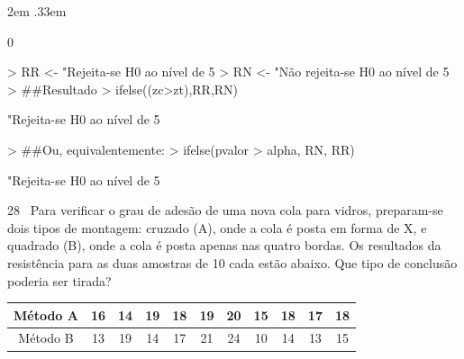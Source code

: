 \documentclass{article}
\newenvironment{ManualExercise}
  {\begin{list}{}{\leftmargin \QuestionIndent
    \partopsep0pt \parsep\parskip \topsep\QuestionBefore
    \itemsep\QuestionBefore \labelwidth2em
    \labelsep.33em
    \usecounter{Question}}}
  {\end{list}}
\begin{document}
\begin{Exercise}
\begin{ManualExercise}
\begin{Schunk}
\begin{Soutput}
[1] 0
\end{Soutput}
\begin{Sinput}
> RR <- "Rejeita-se H0 ao nível de 5%
> RN <- "Não rejeita-se H0 ao nível de 5%
> ##Resultado
> ifelse((zc>zt),RR,RN)
\end{Sinput}
\begin{Soutput}
[1] "Rejeita-se H0 ao nível de 5%
\end{Soutput}
\begin{Sinput}
> ##Ou, equivalentemente:
> ifelse(pvalor > alpha, RN, RR)
\end{Sinput}
\begin{Soutput}
[1] "Rejeita-se H0 ao nível de 5%
\end{Soutput}
\end{Schunk}

\item[28~] Para verificar o grau de adesão de uma nova cola para vidros, preparam-se dois tipos de montagem: cruzado (A), onde a cola é posta em forma de X, e quadrado (B), onde a cola é posta apenas nas quatro bordas. Os resultados da resistência para as duas amostras de 10 cada estão abaixo. Que tipo de conclusão poderia ser tirada?

\begin{tabular}{c|c|c|c|c|c|c|c|c|c|c} \hline
Método A & 16 & 14 & 19 & 18 & 19 & 20 & 15 & 18 & 17 & 18 \\ \hline
Método B & 13 & 19 & 14 & 17 & 21 & 24 & 10 & 14 & 13 & 15 \\ \hline
\end{tabular}


\end{ManualExercise}
\end{Exercise}
\end{document}
